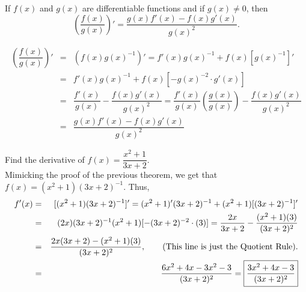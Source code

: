 \documentclass{book}
\begin{document}
\begin{Thm} If $f(x)$ and $g(x)$ are differentiable functions and if $g(x) \neq 0$, then 
\[ \left(\dfrac{f(x)}{g(x)}\right)' = \dfrac{g(x)f'(x) - f(x)g'(x)}{g(x)^2}.\]\end{Thm}
\begin{pf}
\begin{eqnarray*}
\left(\dfrac{f(x)}{g(x)}\right)' &=& (f(x)g(x)^{-1})' = f'(x)g(x)^{-1} + f(x)[g(x)^{-1}]'\\
&=& f'(x)g(x)^{-1} + f(x)[-g(x)^{-2}\cdot g'(x)]\\
&=& \dfrac{f'(x)}{g(x)} - \dfrac{f(x)g'(x)}{g(x)^2} = \dfrac{f'(x)}{g(x)}\left(\dfrac{g(x)}{g(x)}\right) - \dfrac{f(x)g'(x)}{g(x)^2}\\
&=& \dfrac{g(x)f'(x) - f(x)g'(x)}{g(x)^2}
\end{eqnarray*}
\end{pf}\vs

\begin{Exam} Find the derivative of $f(x) = \dfrac{x^2+1}{3x+2}$.\\

Mimicking the proof of the previous theorem, we get that $f(x) = (x^2+1)(3x+2)^{-1}$. Thus, 
\begin{eqnarray*}
f'(x) &=& [(x^2+1)(3x+2)^{-1}]' = (x^2+1)'(3x+2)^{-1} + (x^2+1)[(3x+2)^{-1}]'\\
&=& (2x)(3x+2)^{-1} (x^2+1)[-(3x+2)^{-2}\cdot (3)] = \dfrac{2x}{3x+2} - \dfrac{(x^2+1)(3)}{(3x+2)^{2}}\\
&=& \dfrac{2x(3x+2) - (x^2+1)(3)}{(3x+2)^{2}},\qquad\text{(This line is just the Quotient Rule).}\\
&=& \dfrac{6x^2+4x - 3x^2-3}{(3x+2)^2} = \fbox{$\dfrac{3x^2+4x-3}{(3x+2)^2}$}
\end{eqnarray*}
\end{Exam}

\vfill
{}
\pagebreak
\end{document}
